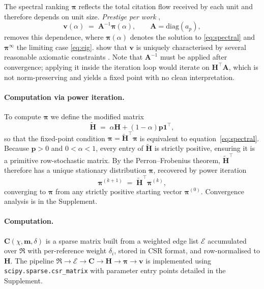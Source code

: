 The spectral ranking $\boldsymbol{\pi}$ reflects the total citation flow
received by each unit and therefore depends on unit size.
\emph{Prestige per work} \citep{palacios-huertaMeasurementIntellectualInfluence2004},
\begin{equation}
    \mathbf{v}(\alpha)
    \;=\;
    \mathbf{A}^{-1}\boldsymbol{\pi}(\alpha),
    \qquad
    \mathbf{A}=\mathrm{diag}(a_p),
    \label{eq:vstar}
\end{equation}
removes this dependence, where $\boldsymbol{\pi}(\alpha)$ denotes the
solution to \eqref{eq:spectral} and $\boldsymbol{\pi}^{\infty}$ the
limiting case \eqref{eq:eig}.
\cite{palacios-huertaMeasurementIntellectualInfluence2004} show that
$\mathbf{v}$ is uniquely characterised by several reasonable axiomatic
constraints \citep[but see][]{serranoMeasurementIntellectualInfluence2004}.
Note that $\mathbf{A}^{-1}$ must be applied after convergence; applying
it inside the iteration loop would iterate on $\mathbf{H}^\top\mathbf{A}$,
which is not norm-preserving and yields a fixed point with no clean
interpretation.

\paragraph{Computation via power iteration.}

To compute $\boldsymbol{\pi}$ we define the modified matrix
\begin{equation}
	\mathbf{\tilde{H}}
	\;=\;
	\alpha\mathbf{H}+(1-\alpha)\mathbf{p}\mathbf{1}^\top,
	\label{eq:Hstar}
\end{equation}
so that the fixed-point condition
$\boldsymbol{\pi}=\mathbf{\tilde{H}}^{\top}\boldsymbol{\pi}$
is equivalent to equation~\eqref{eq:spectral}.
Because $\mathbf{p}>0$ and $0<\alpha<1$, every entry of $\mathbf{\tilde{H}}$
is strictly positive, ensuring it is a primitive row-stochastic matrix.
By the Perron--Frobenius theorem, $\mathbf{\tilde{H}}^{\top}$ therefore
has a unique stationary distribution $\boldsymbol{\pi}$, recovered by
power iteration
\begin{equation}
	\boldsymbol{\pi}^{(k+1)}
	\;=\;
	\mathbf{\tilde{H}}^{\top}\boldsymbol{\pi}^{(k)},
	\label{eq:power}
\end{equation}
converging to $\boldsymbol{\pi}$ from any strictly positive starting
vector $\boldsymbol{\pi}^{(0)}$. Convergence analysis is in the
Supplement.

\paragraph{Computation.}

$\mathbf{C}(\chi,\mathbf{m},\delta)$ is a sparse matrix built from a
weighted edge list $\mathcal{E}$ accumulated over $\mathfrak{R}$ with
per-reference weight $\delta_i$, stored in CSR format, and
row-normalised to $\mathbf{H}$. The pipeline
$\mathfrak{R}\!\to\!\mathcal{E}\!\to\!\mathbf{C}\!\to\!\mathbf{H}
\!\to\!\boldsymbol{\pi}\!\to\!\mathbf{v}$
is implemented using \texttt{scipy.sparse.csr\_matrix} with parameter
entry points detailed in the Supplement.

